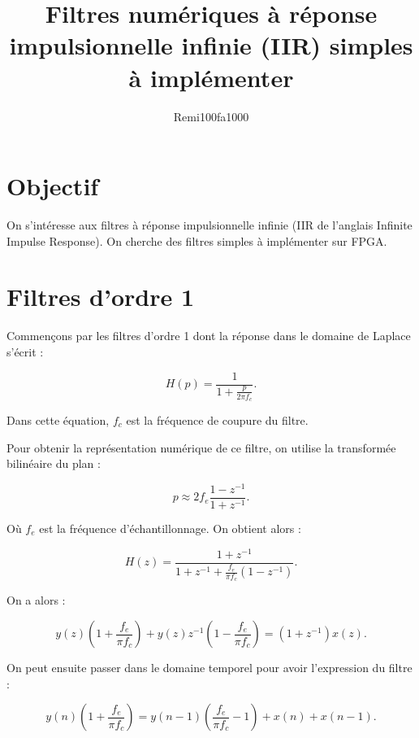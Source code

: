 \documentclass{article}
\begin{document}
\title{Filtres numériques à réponse impulsionnelle infinie (IIR) simples à implémenter}
\author{Remi100fa1000}

\maketitle

\section{Objectif}

On s'intéresse aux filtres à réponse impulsionnelle infinie (IIR de l'anglais Infinite Impulse Response). On cherche des filtres simples à implémenter sur FPGA.

\section{Filtres d'ordre 1}

Commençons par les filtres d'ordre 1 dont la réponse dans le domaine de Laplace s'écrit :

\begin{equation}
H(p) = \frac{1}{1+\frac{p}{2\pi f_c}}.
\end{equation}

Dans cette équation, $f_c$ est la fréquence de coupure du filtre.

Pour obtenir la représentation numérique de ce filtre, on utilise la transformée bilinéaire du plan :

\begin{equation}
p \approx 2f_e \frac{1-z^{-1}}{1+z^{-1}}.
\end{equation}

Où $f_e$ est la fréquence d'échantillonnage. On obtient alors :

\begin{equation}
H(z) = \frac{1+z^{-1}}{1+z^{-1}+\frac{f_e}{\pi f_c}(1-z^{-1})}.
\end{equation}

On a alors :

\begin{equation}
y(z)(1+\frac{f_e}{\pi f_c})+y(z)z^{-1}(1-\frac{f_e}{\pi f_c})= (1+z^{-1})x(z).
\end{equation}

On peut ensuite passer dans le domaine temporel pour avoir l'expression du filtre :

\begin{equation}
y(n)(1+\frac{f_e}{\pi f_c})=y(n-1)(\frac{f_e}{\pi f_c}-1)+x(n)+x(n-1).
\end{equation}
\end{document}
